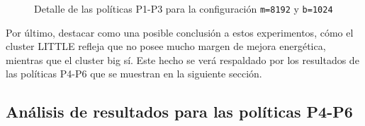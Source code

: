 \begin{figure}
    \begin{subfigure}{0.75\textwidth}
      \centering
      \caption{\odroid}
    \end{subfigure}  
  \caption{Detalle de las políticas P1-P3 para la configuración
    \texttt{m=8192} y \texttt{b=1024}}
  \label{fig:detalle:p1-p4}
\end{figure}

Por último, destacar como una posible conclusión a estos experimentos, cómo
el cluster LITTLE refleja que no posee mucho margen de mejora energética,
mientras que el cluster big sí. Este hecho se verá respaldado por los
resultados de las políticas P4-P6 que se muestran en la siguiente sección.


\subsection{Análisis de resultados para las políticas P4-P6}
